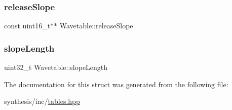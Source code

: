 \mbox{\label{struct_wavetable_a8beb6f53222606b026f3a62bc4a130db}} 
\subsubsection{\texorpdfstring{release\+Slope}{releaseSlope}}
{\footnotesize\ttfamily const uint16\+\_\+t$\ast$$\ast$ Wavetable\+::release\+Slope}

\mbox{\label{struct_wavetable_a59998c0be95e8630d258c4e0f7ba030e}} 
\subsubsection{\texorpdfstring{slope\+Length}{slopeLength}}
{\footnotesize\ttfamily uint32\+\_\+t Wavetable\+::slope\+Length}



The documentation for this struct was generated from the following file\+:\begin{DoxyCompactItemize}
\item 
synthesis/inc/\mbox{\hyperlink{tables_8hpp}{tables.\+hpp}}\end{DoxyCompactItemize}
